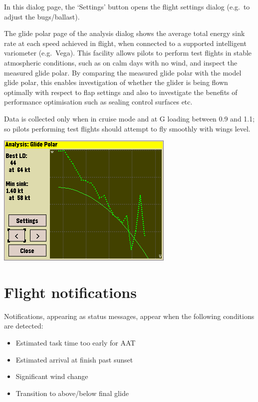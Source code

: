 \documentclass[a4paper,12pt]{refrep}
\begin{document}
In this dialog page, the `Settings' button opens the flight settings
dialog (e.g.\ to adjust the bugs/ballast).

The glide polar page of the analysis dialog shows the average total
energy sink rate at each speed achieved in flight, when connected to a
supported intelligent variometer (e.g.\ Vega).  This facility allows
pilots to perform test flights in stable atmospheric conditions, such
as on calm days with no wind, and inspect the measured glide polar.
By comparing the measured glide polar with the model glide polar, this
enables investigation of whether the glider is being flown optimally
with respect to flap settings and also to investigate the benefits of
performance optimisation such as sealing control surfaces etc.

Data is collected only when in cruise mode and at G loading between
0.9 and 1.1; so pilots performing test flights should attempt to fly
smoothly with wings level.

\begin{center}
\includegraphics[angle=0,width=0.8\linewidth,keepaspectratio='true']{figures/shot-glidepolar.png}
\end{center}

\section{Flight notifications}

 Notifications, appearing as status messages, appear when the
 following conditions are detected: 
\begin{itemize}
\item Estimated task time too early for
 AAT 
\item Estimated arrival at finish past sunset
\item Significant wind change
\item Transition to above/below final glide
\end{itemize}
\end{document}
